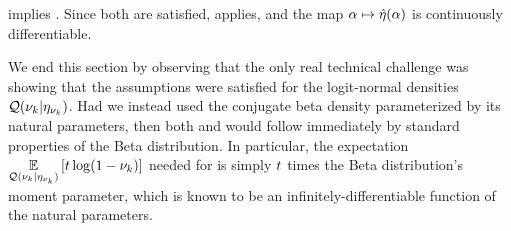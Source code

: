  implies .  Since both
 are satisfied,  applies,
and the map $\alpha \mapsto \hat\eta(\alpha)$ is continuously differentiable.

We end this section by observing that the only real technical challenge was
showing that the assumptions were satisfied for the logit-normal densities
$\mathcal{Q}(\nu_{k} \vert \eta_{\nu_{k}})$.  Had we instead used the conjugate beta density
parameterized by its natural parameters, then both  and
 would follow immediately by standard properties of the
Beta distribution.  In particular, the expectation $\underset{\mathcal{Q}(\nu_{k} \vert
\eta_{\nu_{k}})}{\mathbb{E}}\left[t \log (1 - \nu_{k})\right]$ needed for  is simply $t$
times the Beta distribution's moment parameter, which is known to be an
infinitely-differentiable function of the natural parameters.
